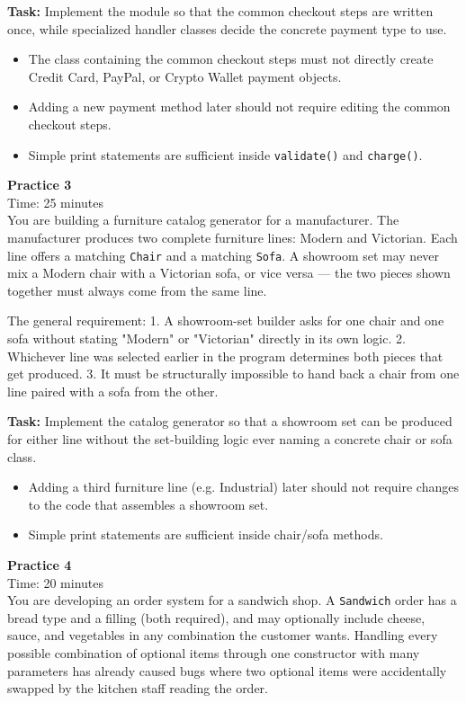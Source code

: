 \documentclass[11pt]{article}
\newcommand{\qheader}[2]{%
    \noindent\textbf{#1}\\[2pt]
    \noindent Time: #2\\[10pt]
}
\begin{document}
\vspace{6pt}
\noindent
\textbf{Task:} Implement the module so that the common checkout steps are written once, while specialized handler classes decide the concrete payment type to use.
\begin{itemize}[nosep]
    \item The class containing the common checkout steps must not directly create Credit Card, PayPal, or Crypto Wallet payment objects.
    \item Adding a new payment method later should not require editing the common checkout steps.
    \item Simple print statements are sufficient inside \texttt{validate()} and \texttt{charge()}.
\end{itemize}

\newpage

\qheader{Practice 3}{25 minutes}
\noindent
You are building a furniture catalog generator for a manufacturer. The manufacturer produces two complete furniture lines: Modern and Victorian. Each line offers a matching \texttt{Chair} and a matching \texttt{Sofa}. A showroom set may never mix a Modern chair with a Victorian sofa, or vice versa --- the two pieces shown together must always come from the same line.

\vspace{6pt}
\noindent
The general requirement: 1. A showroom-set builder asks for one chair and one sofa without stating "Modern" or "Victorian" directly in its own logic. 2. Whichever line was selected earlier in the program determines both pieces that get produced. 3. It must be structurally impossible to hand back a chair from one line paired with a sofa from the other.

\vspace{6pt}
\noindent
\textbf{Task:} Implement the catalog generator so that a showroom set can be produced for either line without the set-building logic ever naming a concrete chair or sofa class.
\begin{itemize}[nosep]
    \item Adding a third furniture line (e.g. Industrial) later should not require changes to the code that assembles a showroom set.
    \item Simple print statements are sufficient inside chair/sofa methods.
\end{itemize}

\newpage

\qheader{Practice 4}{20 minutes}
\noindent
You are developing an order system for a sandwich shop. A \texttt{Sandwich} order has a bread type and a filling (both required), and may optionally include cheese, sauce, and vegetables in any combination the customer wants. Handling every possible combination of optional items through one constructor with many parameters has already caused bugs where two optional items were accidentally swapped by the kitchen staff reading the order.
\end{document}
